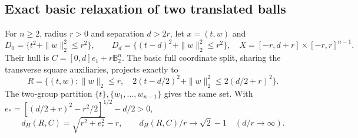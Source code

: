 \subsection{Exact basic relaxation of two translated balls}
\begin{proposition}\label{prop:psplit-balls}
For $n\ge2$, radius $r>0$ and separation $d>2r$, let $x=(t,w)$ and
\[
 D_0=\{t^2+\|w\|_2^2\le r^2\},\qquad
 D_d=\{(t-d)^2+\|w\|_2^2\le r^2\},
 \quad X=[-r,d+r]\times[-r,r]^{n-1}.
\]
Their hull is $C=[0,d]e_1+r\mathbb B_2^n$. The basic full coordinate
split, sharing the transverse square auxiliaries, projects exactly to
\begin{equation}\label{eq:psplit-ball-projection}
 R=\{(t,w):\|w\|_2\le r,\quad
                2(t-d/2)^2+\|w\|_2^2\le2(d/2+r)^2\}.
\end{equation}
The two-group partition $\{t\},\{w_1,\ldots,w_{n-1}\}$ gives the same
set. With $e_*=[(d/2+r)^2-r^2/2]^{1/2}-d/2>0$,
\begin{equation}\label{eq:psplit-ball-distance}
 d_H(R,C)=\sqrt{r^2+e_*^2}-r,
 \qquad d_H(R,C)/r\longrightarrow\sqrt2-1\quad(d/r\to\infty).
\end{equation}
\end{proposition}
